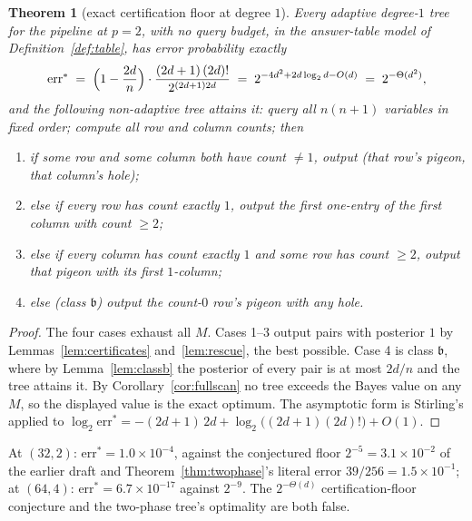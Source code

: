 \documentclass[11pt]{article}
\newtheorem{theorem}{Theorem}[section]
\theoremstyle{definition}
\theoremstyle{remark}
\begin{document}
\begin{theorem}[exact certification floor at degree $1$]\label{thm:floor}
Every adaptive degree-$1$ tree for the pipeline at $p=2$, with no
query budget, in the answer-table model of Definition~\ref{def:table},
has error probability exactly
\[
\mathrm{err}^*\;=\;\Bigl(1-\frac{2d}{n}\Bigr)\cdot
\frac{(2d+1)\,(2d)!}{2^{(2d+1)2d}}
\;=\;2^{-4d^2+2d\log_2 d-O(d)}
\;=\;2^{-\Theta(d^2)},
\]
and the following \emph{non-adaptive} tree attains it: query all
$n(n+1)$ variables in fixed order; compute all row and column counts;
then
\begin{enumerate}
\item[(1)] if some row and some column both have count $\neq1$, output
(that row's pigeon, that column's hole);
\item[(2)] else if every row has count exactly $1$, output the first
one-entry of the first column with count $\ge2$;
\item[(3)] else if every column has count exactly $1$ and some row has
count $\ge2$, output that pigeon with its first $1$-column;
\item[(4)] else (class $\mathfrak{b}$) output the count-$0$ row's
pigeon with any hole.
\end{enumerate}
\end{theorem}

\begin{proof}
The four cases exhaust all $M$.  Cases 1--3 output pairs with
posterior $1$ by Lemmas~\ref{lem:certificates} and~\ref{lem:rescue},
the best possible.  Case 4 is class $\mathfrak{b}$, where by
Lemma~\ref{lem:classb} the posterior of every pair is at most $2d/n$
and the tree attains it.  By Corollary~\ref{cor:fullscan} no tree
exceeds the Bayes value on any $M$, so the displayed value is the
exact optimum.  The asymptotic form is Stirling's applied to
$\log_2\mathrm{err}^*
=-(2d+1)\,2d+\log_2\bigl((2d+1)(2d)!\bigr)+O(1)$.
\end{proof}

At $(32,2)$: $\mathrm{err}^*=1.0\times10^{-4}$, against the conjectured
floor $2^{-5}=3.1\times10^{-2}$ of the earlier draft and
Theorem~\ref{thm:twophase}'s literal error $39/256=1.5\times10^{-1}$;
at $(64,4)$: $\mathrm{err}^*=6.7\times10^{-17}$ against $2^{-9}$.
The $2^{-\Theta(d)}$ certification-floor conjecture and the two-phase
tree's optimality are both false.
\end{document}
